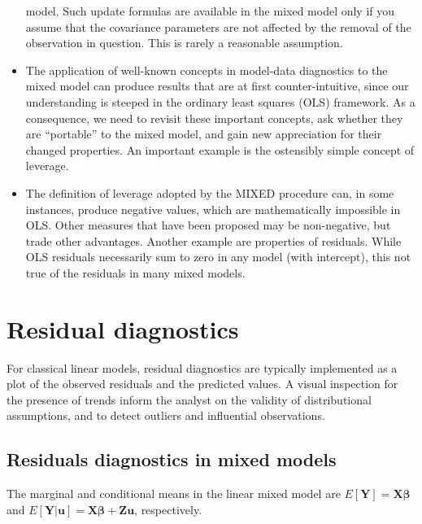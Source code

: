 \documentclass[main.tex]{subfiles}
\begin{document}
\begin{itemize}
		model. Such update formulas are available in the mixed model only if you assume that the covariance
		parameters are not affected by the removal of the observation in question. This is rarely a reasonable
		assumption.
		\item The application of well-known concepts in model-data diagnostics to the mixed model can produce results
		that are at first counter-intuitive, since our understanding is steeped in the ordinary least squares
		(OLS) framework. As a consequence, we need to revisit these important concepts, ask whether they
		are “portable” to the mixed model, and gain new appreciation for their changed properties. An important
		example is the ostensibly simple concept of leverage. 
		\item The definition of leverage adopted by
		the MIXED procedure can, in some instances, produce negative values, which are mathematically
		impossible in OLS. Other measures that have been proposed may be non-negative, but trade other
		advantages. Another example are properties of residuals. While OLS residuals necessarily sum to
		zero in any model (with intercept), this not true of the residuals in many mixed models.
	\end{itemize}
	\newpage
	\newpage
	\section{Residual diagnostics} %
	For classical linear models, residual diagnostics are typically implemented as a plot of the observed residuals and the predicted values. A visual inspection for the presence of trends inform the analyst on the validity of distributional assumptions, and to detect outliers and influential observations.
	
	
	
	
	\subsection{Residuals diagnostics in mixed models}
	
	The marginal and conditional means in the linear mixed model are
	$E[\boldsymbol{Y}] = \boldsymbol{X}\boldsymbol{\beta}$ and
	$E[\boldsymbol{Y|\boldsymbol{u}}] = \boldsymbol{X}\boldsymbol{\beta} + \boldsymbol{Z}\boldsymbol{u}$, respectively.
	
\end{document}
